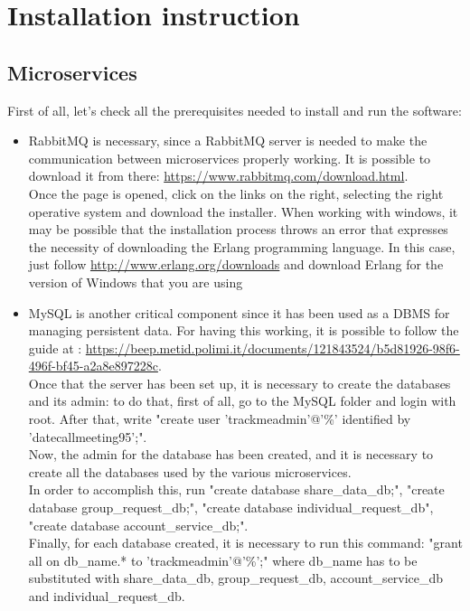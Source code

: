 \section{Installation instruction}
\subsection{Microservices}
First of all, let's check all the prerequisites needed to install and run the software:

\begin{itemize}

\item RabbitMQ is necessary, since a RabbitMQ server is needed to make the communication between microservices properly working.
It is possible to download it from there: \url{https://www.rabbitmq.com/download.html}. \\
Once the page is opened, click on the links on the right, selecting the right operative system and download the installer. 
When working with windows, it may be possible that the installation process throws an error that expresses the necessity of downloading
the Erlang programming language. In this case, just follow \url{http://www.erlang.org/downloads} and download Erlang for the version
of Windows that you are using

\item MySQL is another critical component since it has been used as a DBMS for managing persistent data. For having this working, it
is possible to follow the guide at : \url{https://beep.metid.polimi.it/documents/121843524/b5d81926-98f6-496f-bf45-a2a8e897228c}. \\
Once that the server has been set up, it is necessary to create the databases and its admin: to do that, first of all, go to the MySQL 
folder and login with root. After that, write "create user 'trackmeadmin'@'\%' identified by 'datecallmeeting95';". \\
Now, the admin for the database has been created, and it is necessary to create all the databases used by the various microservices. \\
In order to accomplish this, run "create database share\_data\_db;", "create database group\_request\_db;", 
"create database individual\_request\_db", "create database account\_service\_db;". \\
Finally, for each database created, it is necessary to run this command: "grant all on db\_name.* to 'trackmeadmin'@'\%';"
where db\_name has to be substituted with share\_data\_db, group\_request\_db, account\_service\_db and individual\_request\_db. 

\end{itemize}

